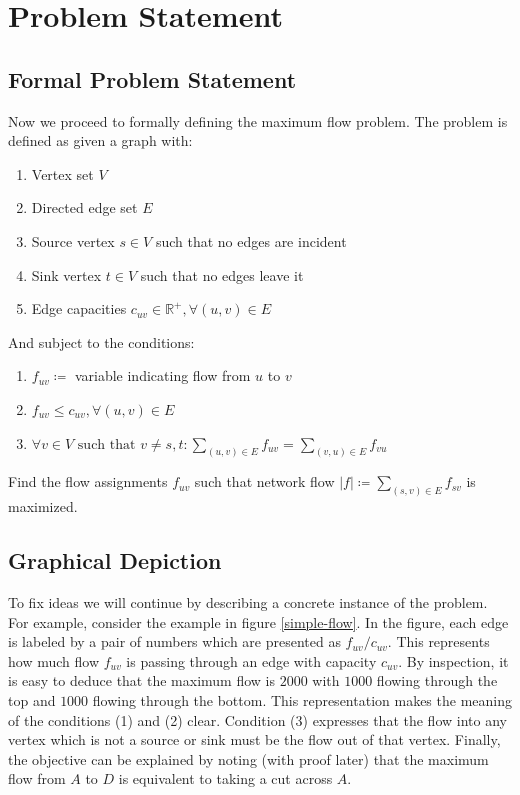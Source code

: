 \documentclass{acm_proc_article-sp}
\begin{document}
\section{Problem Statement}
\subsection{Formal Problem Statement}
\label{formal-problem-statement}
Now we proceed to formally defining the maximum flow problem. The problem is defined as given a graph with: 
\begin{enumerate}
	\item Vertex set $V$
	\item Directed edge set $E$
	\item Source vertex $s\in V$ such that no edges are incident
	\item Sink vertex $t\in V$ such that no edges leave it
	\item Edge capacities $c_{uv}\in \mathbb{R}^+, \forall (u,v)\in E$
\end{enumerate}

And subject to the conditions:
\begin{enumerate}
	\item $f_{uv}\coloneqq$ variable indicating flow from $u$ to $v$
	\item  $f_{uv}\le c_{uv},\forall (u,v)\in E$
	\item $\forall v\in V\text{ such that }v\ne s,t:\sum_{(u,v)\in E}f_{uv}=\sum_{(v, u)\in E} f_{vu}$
\end{enumerate}

Find the flow assignments $f_{uv}$ such that network flow $|f|\coloneqq\sum_{(s,v)\in E}f_{sv}$ is maximized.

\subsection{Graphical Depiction}
To fix ideas we will continue by describing a concrete instance of the problem. For example, consider the example in figure \ref{simple-flow}\cite{wiki:fordfulk}. In the figure, each edge is labeled by a pair of numbers which are presented as $f_{uv}/c_{uv}$. This represents how much flow $f_{uv}$ is passing through an edge with capacity $c_{uv}$. By inspection, it is easy to deduce that the maximum flow is $2000$ with $1000$ flowing through the top and $1000$ flowing through the bottom. This representation makes the meaning of the conditions (1) and (2) clear. Condition (3) expresses that the flow into any vertex which is not a source or sink must be the flow out of that vertex. Finally, the objective can be explained by noting (with proof later) that the maximum flow from $A$ to $D$ is equivalent to taking a cut across $A$.
\end{document}
